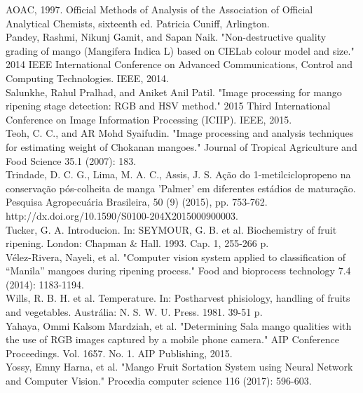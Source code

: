 \noindent AOAC, 1997. Official Methods of Analysis of the Association of Official Analytical Chemists, sixteenth ed. Patricia Cuniff, Arlington.
\\

\noindent Pandey, Rashmi, Nikunj Gamit, and Sapan Naik. "Non-destructive quality grading of mango (Mangifera Indica L) based on CIELab colour model and size." 2014 IEEE International Conference on Advanced Communications, Control and Computing Technologies. IEEE, 2014.
\\

\noindent Salunkhe, Rahul Pralhad, and Aniket Anil Patil. "Image processing for mango ripening stage detection: RGB and HSV method." 2015 Third International Conference on Image Information Processing (ICIIP). IEEE, 2015.
\\

\noindent Teoh, C. C., and AR Mohd Syaifudin. "Image processing and analysis techniques for estimating weight of Chokanan mangoes." Journal of Tropical Agriculture and Food Science 35.1 (2007): 183.
\\

\noindent Trindade, D. C. G., Lima, M. A. C., Assis, J. S. Ação do 1-metilciclopropeno na conservação pós-colheita de manga 'Palmer' em diferentes estádios de maturação. Pesquisa Agropecuária Brasileira, 50 (9) (2015), pp. 753-762. http://dx.doi.org/10.1590/S0100-204X2015000900003.
\\

\noindent Tucker, G. A. Introducion. In: SEYMOUR, G. B. et al. Biochemistry of fruit ripening.
London: Chapman & Hall. 1993. Cap. 1, 255-266 p.
\\

\noindent Vélez-Rivera, Nayeli, et al. "Computer vision system applied to classification of “Manila” mangoes during ripening process." Food and bioprocess technology 7.4 (2014): 1183-1194.
\\

\noindent Wills, R. B. H. et al. Temperature. In: Postharvest phisiology, handling of fruits and
vegetables. Austrália: N. S. W. U. Press. 1981. 39-51 p.
\\

\noindent Yahaya, Ommi Kalsom Mardziah, et al. "Determining Sala mango qualities with the use of RGB images captured by a mobile phone camera." AIP Conference Proceedings. Vol. 1657. No. 1. AIP Publishing, 2015.
\\

\noindent Yossy, Emny Harna, et al. "Mango Fruit Sortation System using Neural Network and Computer Vision." Procedia computer science 116 (2017): 596-603.
\\

